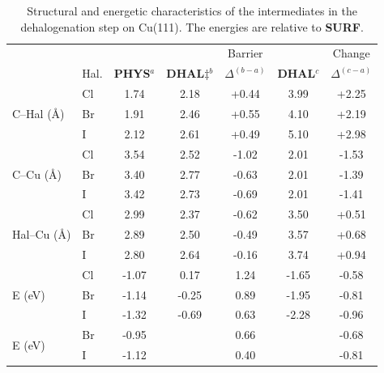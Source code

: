 \documentclass[aps,prl,reprint,amsmath,amssymb,floatfix,notitlepage]{revtex4-1}
\begin{document}
\begin{table}
\centering
\caption{Structural and energetic characteristics of the intermediates in the dehalogenation step on Cu(111). The energies are relative to \textbf{SURF}.}
\label{table:bondlength}
\begin{tabular}{ llccccc  }
 \hline
 \hline
  & & & & Barrier & & Change \\
  & Hal. & \textbf{PHYS}$^{a}$ & \textbf{DHAL$\ddagger$}$^{b}$ & $\Delta^{(b-a)}$ & \textbf{DHAL}$^{c}$ & $\Delta^{(c-a)}$ \\ 
 \hline 
 \multirow{3}{*}{C--Hal (\si{\angstrom})} & Cl & 1.74 & 2.18 & +0.44 & 3.99 & +2.25 \\ 
 & Br & 1.91 & 2.46 & +0.55 & 4.10 &+2.19 \\ 
 & I & 2.12 & 2.61 & +0.49 & 5.10 &+2.98 \\ 
 \hline
 \multirow{3}{*}{C--Cu (\si{\angstrom}) } & Cl & 3.54 & 2.52 & -1.02 & 2.01 & -1.53 \\ 
 & Br & 3.40 & 2.77 & -0.63 & 2.01 & -1.39 \\ 
 & I &3.42 & 2.73 &-0.69 & 2.01 & -1.41 \\ 
 \hline
 \multirow{3}{*}{Hal--Cu (\si{\angstrom}) } & Cl & 2.99 & 2.37 & -0.62 & 3.50 & +0.51 \\ 
 & Br & 2.89 & 2.50 & -0.49 & 3.57 & +0.68 \\ 
 & I &2.80 & 2.64 &-0.16 & 3.74 & +0.94 \\ 
 \hline
 \multirow{3}{*}{E (\si{\electronvolt}) } & Cl & -1.07 & 0.17 & 1.24 &-1.65 & -0.58 \\ 
 & Br &-1.14 &-0.25 & 0.89 & -1.95& -0.81 \\ 
 & I  & -1.32 & -0.69 & 0.63 & -2.28& -0.96 \\ 
 \hline
 \multirow{2}{*}{E (\si{\electronvolt})~\cite{jacs2013}} & Br &-0.95 & & 0.66 & & -0.68 \\ 
 & I & -1.12 & & 0.40 & & -0.81 \\ 
 \hline
 \hline
\end{tabular}
\end{table}
\end{document}
